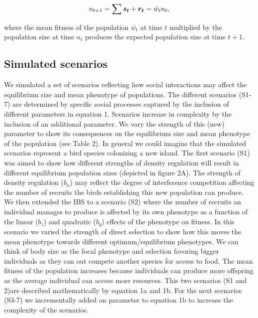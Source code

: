 \documentclass{article}
\begin{document}
\begin{equation}
n_{t+1}=\sum \vectorsym{s_{t}} + \vectorsym{r_{t}}=\bar{w_{t}}n_{t}, 
\end{equation}

\noindent where the mean fitness of the population $\bar{w_{t}}$ at time $t$  multiplied by the population size at time $n_{t}$ produces the expected population size at time $t + 1$. 

 
\subsection{Simulated scenarios}
We simulated a set of scenarios reflecting how social interactions may affect the equilibrium size and mean phenotype of populations. The different scenarios (S1-7) are determined by specific social processes captured by the inclusion of different parameters in equation 1. Scenarios increase in complexity by the inclusion of an additional parameter. We vary the strength of this (new) parameter to show its consequences on the equilibrium size and mean phenotype of the population (see Table 2). In general we could imagine that the simulated scenarios represent a bird species colonizing a new island. The first scenario (S1) was aimed to show how different strengths of density regulation will result in different equilibrium population sizes (depicted in figure 2A). The strength of density regulation ($b_n$) may reflect the degree of interference competition affecting the number of recruits the birds establishing this new population can produce. We then extended the IBS to a scenario (S2) where the number of recruits an individual manages to produce is affected by its own phenotype as a function of the linear ($b_z$) and quadratic ($b_q$) effects of the phenotype on fitness. In this scenario we varied the strength of direct selection to show how this moves the mean phenotype towards different optimum/equilibrium phenotypes. We can think of body size as the focal phenotype and selection favoring bigger individuals as they can out compete another species for access to food. The mean fitness of the population increases because individuals can produce more offspring as the average individual can access more resources. This two scenarios (S1 and 2)are described mathematically by equation 1a and 1b. For the next scenarios (S3-7) we incrementally added on parameter to equation 1b to increase the complexity of the scenarios.
\end{document}
